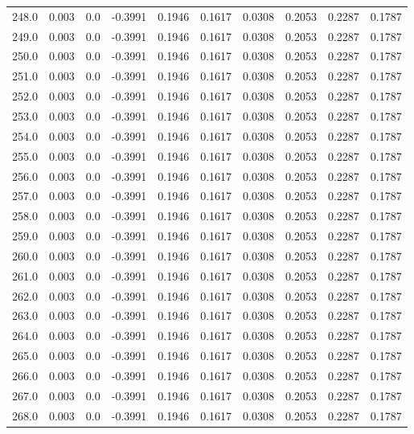 \begin{longtable}{lrrrrrrrrr}
248.0 & 0.003 & 0.0 & -0.3991 & 0.1946 & 0.1617 & 0.0308 & 0.2053 & 0.2287 & 0.1787 \\
249.0 & 0.003 & 0.0 & -0.3991 & 0.1946 & 0.1617 & 0.0308 & 0.2053 & 0.2287 & 0.1787 \\
250.0 & 0.003 & 0.0 & -0.3991 & 0.1946 & 0.1617 & 0.0308 & 0.2053 & 0.2287 & 0.1787 \\
251.0 & 0.003 & 0.0 & -0.3991 & 0.1946 & 0.1617 & 0.0308 & 0.2053 & 0.2287 & 0.1787 \\
252.0 & 0.003 & 0.0 & -0.3991 & 0.1946 & 0.1617 & 0.0308 & 0.2053 & 0.2287 & 0.1787 \\
253.0 & 0.003 & 0.0 & -0.3991 & 0.1946 & 0.1617 & 0.0308 & 0.2053 & 0.2287 & 0.1787 \\
254.0 & 0.003 & 0.0 & -0.3991 & 0.1946 & 0.1617 & 0.0308 & 0.2053 & 0.2287 & 0.1787 \\
255.0 & 0.003 & 0.0 & -0.3991 & 0.1946 & 0.1617 & 0.0308 & 0.2053 & 0.2287 & 0.1787 \\
256.0 & 0.003 & 0.0 & -0.3991 & 0.1946 & 0.1617 & 0.0308 & 0.2053 & 0.2287 & 0.1787 \\
257.0 & 0.003 & 0.0 & -0.3991 & 0.1946 & 0.1617 & 0.0308 & 0.2053 & 0.2287 & 0.1787 \\
258.0 & 0.003 & 0.0 & -0.3991 & 0.1946 & 0.1617 & 0.0308 & 0.2053 & 0.2287 & 0.1787 \\
259.0 & 0.003 & 0.0 & -0.3991 & 0.1946 & 0.1617 & 0.0308 & 0.2053 & 0.2287 & 0.1787 \\
260.0 & 0.003 & 0.0 & -0.3991 & 0.1946 & 0.1617 & 0.0308 & 0.2053 & 0.2287 & 0.1787 \\
261.0 & 0.003 & 0.0 & -0.3991 & 0.1946 & 0.1617 & 0.0308 & 0.2053 & 0.2287 & 0.1787 \\
262.0 & 0.003 & 0.0 & -0.3991 & 0.1946 & 0.1617 & 0.0308 & 0.2053 & 0.2287 & 0.1787 \\
263.0 & 0.003 & 0.0 & -0.3991 & 0.1946 & 0.1617 & 0.0308 & 0.2053 & 0.2287 & 0.1787 \\
264.0 & 0.003 & 0.0 & -0.3991 & 0.1946 & 0.1617 & 0.0308 & 0.2053 & 0.2287 & 0.1787 \\
265.0 & 0.003 & 0.0 & -0.3991 & 0.1946 & 0.1617 & 0.0308 & 0.2053 & 0.2287 & 0.1787 \\
266.0 & 0.003 & 0.0 & -0.3991 & 0.1946 & 0.1617 & 0.0308 & 0.2053 & 0.2287 & 0.1787 \\
267.0 & 0.003 & 0.0 & -0.3991 & 0.1946 & 0.1617 & 0.0308 & 0.2053 & 0.2287 & 0.1787 \\
268.0 & 0.003 & 0.0 & -0.3991 & 0.1946 & 0.1617 & 0.0308 & 0.2053 & 0.2287 & 0.1787 \\

\end{longtable}

